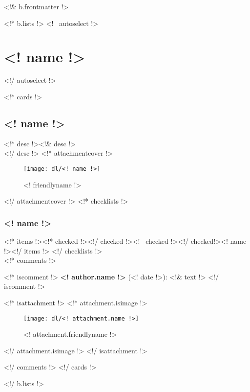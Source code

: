 



\renewcommand{\chaptertitle}{<! b.title !>}
\renewcommand{\today}{FTC Notebook 2015-2016}
\renewcommand{\sectiontitle}{Revision <! b.lastmodified !>}

\setcounter{chapter}{1}
\setcounter{page}{1}
\renewcommand\contentsname{Table of Contents}
\setcounter{tocdepth}{2}
\renewcommand{\sectiontitle}{Table of Contents}
\tableofcontents
\renewcommand{\thesection}{}
\cleardoublepage

<!& b.frontmatter !>

\cleardoublepage
\color{black}

\cleardoublepage
\renewcommand{\chaptertitle}{Engineering Section}
\renewcommand{\today}{\mbox{}}
\renewcommand{\sectiontitle}{Directly from Trello}

<!* b.lists !>
<!~ autoselect !>\section{<! name !>}<!/ autoselect !>

<!* cards !>
\subsection{<! name !>}
<!* desc !><!& desc !>\\<!/ desc !>
<!* attachmentcover !>
\begin{figure}[htbp]
  \centering
  \texttt{[image: dl/<! name !>]}
  \caption[]{<! friendlyname !>}
  \label{fig:<! name !>}
\end{figure}
<!/ attachmentcover !>
<!* checklists !>
\subsubsection{<! name !>}
<!* items !><!* checked !>\boxchecked<!/ checked !><!~ checked !>\boxunchecked<!/ checked!><! name !><!/ items !>
<!/ checklists !>\mbox{}\\


<!* comments !>

<!* iscomment !>
{\bf <! author.name !>} {\color{darkgray} (<! date !>)}: <!& text !>
<!/ iscomment !>

<!* isattachment !>
<!* attachment.isimage !>
\begin{figure}[H]
  \centering
  \texttt{[image: dl/<! attachment.name !>]}
  \caption[]{<! attachment.friendlyname !>}
  \label{fig:<! attachment.name !>}
\end{figure}
<!/ attachment.isimage !>
<!/ isattachment !>

<!/ comments !>
\newpage
\clearpage
<!/ cards !>

<!/ b.lists !>



